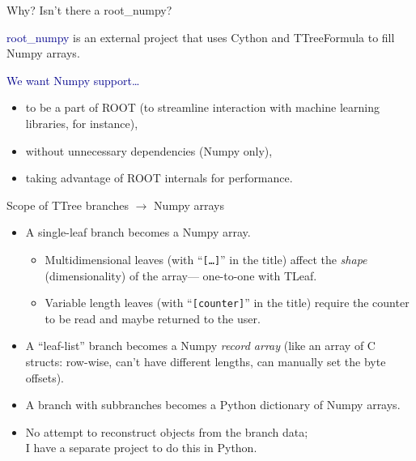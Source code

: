\documentclass{beamer}
\begin{document}
\begin{frame}{Why? Isn't there a root\_numpy?}
\vspace{0.5 cm}
\large

\textcolor{darkblue}{root\_numpy} is an external project that uses Cython and TTreeFormula to fill Numpy arrays.

\vspace{0.5 cm}
\textcolor{darkblue}{We want Numpy support\ldots}
\begin{itemize}
\item to be a part of ROOT (to streamline interaction with machine learning libraries, for instance),
\item without unnecessary dependencies (Numpy only),
\item taking advantage of ROOT internals for performance.
\end{itemize}

\vspace{0.5 cm}
\end{frame}

\begin{frame}{Scope of TTree branches $\to$ Numpy arrays}
\vspace{0.5 cm}
\large
\begin{itemize}\setlength{\itemsep}{0.25 cm}
\item<1-> A single-leaf branch becomes a Numpy array.

\vspace{0.15 cm}
\begin{itemize}\setlength{\itemsep}{0.25 cm}
\item<2-> Multidimensional leaves (with ``{\tt[\ldots]}'' in the title) affect the {\it shape} (dimensionality) of the array--- one-to-one with TLeaf.
\item<3-> Variable length leaves (with ``{\tt[counter]}'' in the title) require the counter to be read and maybe returned to the user.
\end{itemize}

\item<4-> A ``leaf-list'' branch becomes a Numpy {\it record array} {\normalsize (like an array of C structs: row-wise, can't have different lengths, can manually set the byte offsets).}

\item<5-> A branch with subbranches becomes a Python dictionary of Numpy arrays.

\item<6-> No attempt to reconstruct objects from the branch data; \\ I have a separate project to do this in Python.
\end{itemize}
\end{frame}
\end{document}

